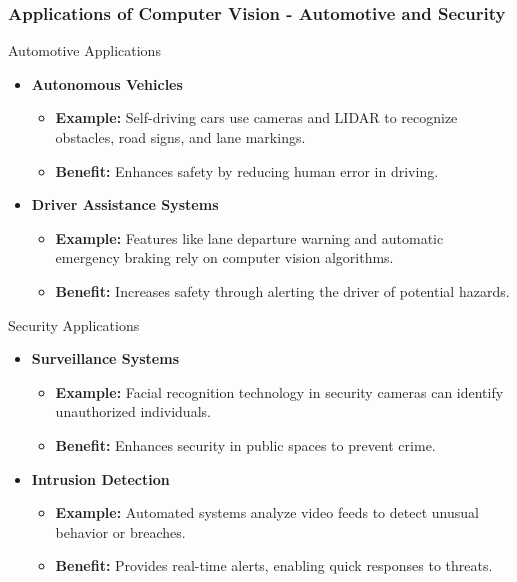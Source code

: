 \documentclass[aspectratio=169]{beamer}
\begin{document}
\begin{frame}[fragile]
    \frametitle{Applications of Computer Vision - Automotive and Security}
    \begin{block}{Automotive Applications}
        \begin{itemize}
            \item \textbf{Autonomous Vehicles}
                \begin{itemize}
                    \item \textbf{Example:} Self-driving cars use cameras and LIDAR to recognize obstacles, road signs, and lane markings.
                    \item \textbf{Benefit:} Enhances safety by reducing human error in driving.
                \end{itemize}
            \item \textbf{Driver Assistance Systems}
                \begin{itemize}
                    \item \textbf{Example:} Features like lane departure warning and automatic emergency braking rely on computer vision algorithms.
                    \item \textbf{Benefit:} Increases safety through alerting the driver of potential hazards.
                \end{itemize}
        \end{itemize}
    \end{block}

    \begin{block}{Security Applications}
        \begin{itemize}
            \item \textbf{Surveillance Systems}
                \begin{itemize}
                    \item \textbf{Example:} Facial recognition technology in security cameras can identify unauthorized individuals.
                    \item \textbf{Benefit:} Enhances security in public spaces to prevent crime.
                \end{itemize}
            \item \textbf{Intrusion Detection}
                \begin{itemize}
                    \item \textbf{Example:} Automated systems analyze video feeds to detect unusual behavior or breaches.
                    \item \textbf{Benefit:} Provides real-time alerts, enabling quick responses to threats.
                \end{itemize}
        \end{itemize}
    \end{block}
\end{frame}
\end{document}
